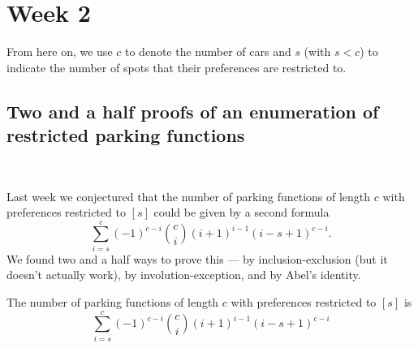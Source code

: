 \section{Week 2}

\begin{remark}[notation]
	From here on, we use $c$ to denote the number of cars and $s$ (with $s < c$) to indicate the number of spots that their preferences are restricted to.
\end{remark}

\subsection*{Two and a half proofs of an enumeration of restricted parking functions}~

Last week we conjectured that the number of parking functions of length $c$ with preferences restricted to $[s]$ could be given by a second formula
\[
	\sum_{i = s}^{c} (-1)^{c - i} \binom{c}{i} (i + 1)^{i - 1}(i - s + 1)^{c - i}.
\]
We found two and a half ways to prove this --- by inclusion-exclusion (but it doesn't actually work), by involution-exception, and by Abel's identity.

\begin{theorem} \label{thm: res-count}
	The number of parking functions of length $c$ with preferences restricted to $[s]$ is
	\[
		\sum_{i = s}^{c} (-1)^{c - i} \binom{c}{i} (i + 1)^{i - 1}(i - s + 1)^{c - i}
	\]
\end{theorem}

